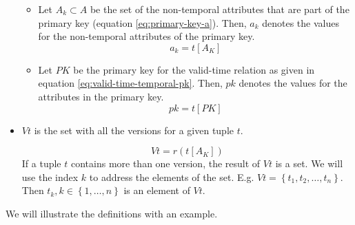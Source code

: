 \begin{definition}
\begin{itemize}
\begin{itemize}
      \item Let $A_k \subset A$ be the set of the non-temporal attributes that are part of the primary key (equation \eqref{eq:primary-key-a}). Then, $a_k$ denotes the values for the non-temporal attributes of the primary key.
	    \begin{equation}
	     \label{eq:all-the-versions} 
	      a_k = t\left[A_K \right]
	    \end{equation}

    \item Let $PK$ be the primary key for the valid-time relation as given in equation \eqref{eq:valid-time-temporal-pk}. Then, $pk$ denotes the values for the attributes in the primary key.
	  \begin{equation}
	   \label{eq:value-pk}
	  pk = t\left[PK \right]
	  \end{equation}


      \end{itemize}
\item $Vt$ is the set with all the versions for a given tuple $t$.

\begin{equation}
 \label{eq:all-the-versions}
Vt = r\left(t\left[A_K\right] \right)
\end{equation}
If a tuple $t$ contains more than one version, the result of $Vt$ is a set. We will use the index $k$ to address the elements of the set. E.g. $Vt = \left \lbrace t_1, t_2, \ldots, t_n \right \rbrace$. Then $t_k , k \in \left \lbrace 1, \ldots, n \right \rbrace$ is an element of $Vt$.
\end{itemize}
\end{definition}
We will illustrate the definitions with an example.

